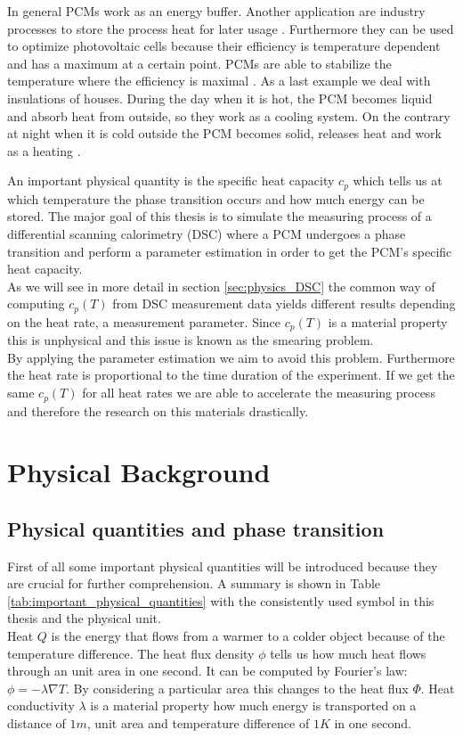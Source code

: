 \documentclass{scrartcl}[12pt, halfparskip]
\begin{document}
In general PCMs work as an energy buffer. Another application are industry processes to store the process heat for later usage \cite{pcm_process_heat}. Furthermore they can be used to optimize photovoltaic cells because their efficiency is temperature dependent and has a maximum at a certain point. PCMs are able to stabilize the temperature where the efficiency is maximal \cite{pcm_solar_cells}. 
As a last example we deal with insulations of houses. During the day when it is hot, the PCM becomes liquid and absorb heat from outside, so they work as a cooling system. On the contrary at night when it is cold outside the PCM becomes solid, releases heat and work as a heating \cite{pcm_house_insulation}. 


An important physical quantity is the specific heat capacity $c_p$ which tells us at which temperature the phase transition occurs and how much energy can be stored. The major goal of this thesis is to simulate the measuring process of a differential scanning calorimetry (DSC) where a PCM undergoes a phase transition and perform a parameter estimation in order to get the PCM's specific heat capacity. \\
As we will see in more detail in section \ref{sec:physics_DSC} the common way of computing $c_p(T)$ from DSC measurement data yields different results depending on the heat rate, a measurement parameter. Since $c_p(T)$ is a material property this is unphysical and this issue is known as the smearing problem. \\
By applying the parameter estimation we aim to avoid this problem. Furthermore the heat rate is proportional to the time duration of the experiment. If we get the same $c_p(T)$ for all heat rates we are able to accelerate the measuring process and therefore the research on this materials drastically. 
 


\section{Physical Background}
\subsection{Physical quantities and phase transition}

First of all some important physical quantities will be introduced because they are crucial for further comprehension. A summary is shown in Table \ref{tab:important_physical_quantities} with the consistently used symbol in this thesis and the physical unit. \\
Heat $Q$ is the energy that flows from a warmer to a colder object because of the temperature difference. The heat flux density $\phi$ tells us how much heat flows through an unit area in one second. It can be computed by Fourier's law: $\phi = - \lambda \nabla T$. By considering a particular area this changes to the heat flux $\varPhi$. Heat conductivity $\lambda$ is a material property how much energy is transported on a distance of $1m$, unit area and temperature difference of $1K$ in one second.
\end{document}
